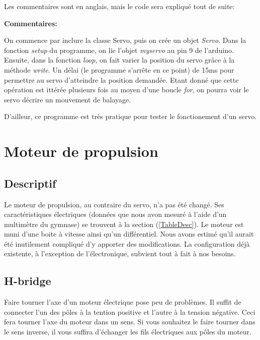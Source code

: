\documentclass[a4paper,12pt]{article}
\begin{document}
{Les commentaires sont en anglais, mais le code sera expliqu\'e tout de suite:



\textbf{Commentaires:}

On commence par inclure la classe Servo, puis on cr\'ee un objet
\emph{Servo}. Dans la fonction \emph{setup} du programme, on lie l'objet
\emph{myservo} au pin 9 de l'arduino. Ensuite, dans la fonction \emph{loop}, on
fait varier la position du servo gr\^ace \`a la m\'ethode \emph{write}. Un
d\'elai (le programme s'arr\^ete en ce point) de 15ms pour permettre au servo
d'atteindre la position demand\'ee. Etant donn\'e que cette op\'eration est
itt\'er\'ee plusieurs fois au moyen d'une boucle \emph{for}, on pourra voir le
servo d\'ecrire un mouvement de balayage.

D'ailleur, ce programme est tr\`es pratique pour tester le fonctionement d'un servo. 

\section{Moteur de propulsion}

\subsection{Descriptif}

Le moteur de propulsion, au contraire du servo, n'a pas été changé.
 Ses caract\'eristiques \'electriques (donn\'ees que nous avon mesur\'e \`a l'aide
d'un multim\`etre du gymnase) se trouvent \`a la section
(\ref{TableDesc}). Le moteur est muni d'une boite \`a vitesse ainsi qu'un
diff\'erentiel. Nous avons estim\'e qu'il aurait \'et\'e
inutilement compliqu\'e d'y apporter des modifications. La
configuration d\'ej\`a existente, \`a l'exception de l'\'electronique,
subvient tout \`a fait \`a nos besoins.  

\subsection{H-bridge}
Faire tourner l'axe d'un moteur \'electrique pose peu de probl\`emes. Il
suffit de connecter l'un des p\^oles \`a la tention positive et l'autre \`a la tension
n\'egative. Ceci fera tourner l'axe du moteur dans un sens. Si vous souhaitez le
faire tourner dans le sens inverse, il vous suffira d'\'echanger les fils
\'electriques aux p\^oles du moteur.

}
\end{document}

